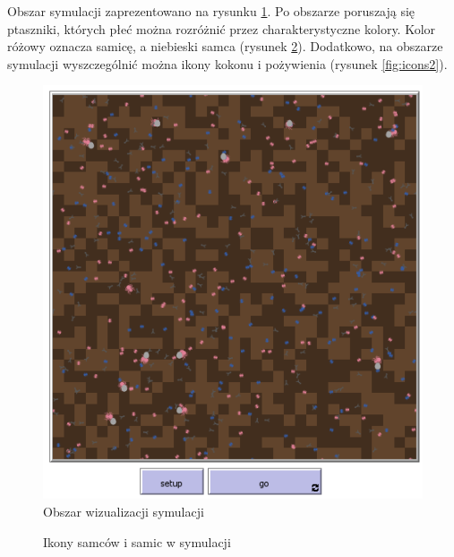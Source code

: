 \documentclass[a4paper,11pt,titlepage]{article}
\begin{document}
Obszar symulacji zaprezentowano na rysunku \ref{fig:1}. Po obszarze poruszają się ptaszniki, których płeć można rozróżnić przez charakterystyczne kolory. Kolor różowy oznacza samicę, a niebieski samca (rysunek \ref{fig:icons1}). Dodatkowo, na obszarze symulacji wyszczególnić można ikony kokonu i pożywienia (rysunek \ref{fig:icons2}).
\begin{figure}[H]
\centering
\includegraphics[width=.75\columnwidth]{img/map.PNG}
\caption{Obszar wizualizacji symulacji}
\label{fig:1}
\end{figure}

\begin{figure}[H]%
    \centering
    \qquad
    \caption{Ikony samców i samic w symulacji}%
    \label{fig:icons1}%
\end{figure}
\end{document}
